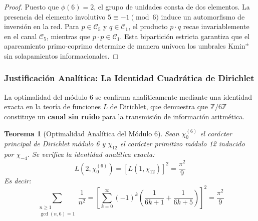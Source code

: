 \documentclass{article}
\numberwithin{equation}{section}
\theoremstyle{plain}
\newtheorem{theorem}{Teorema}[section]
\theoremstyle{definition}
\begin{document}
\begin{proof}
Puesto que $\phi(6) = 2$, el grupo de unidades consta de dos elementos. La presencia del elemento involutivo $5 \equiv -1 \pmod 6$ induce un automorfismo de inversión en la red. Para $p \in \mathcal{C}_5$ y $q \in \mathcal{C}_1$, el producto $p \cdot q$ recae invariablemente en el canal $\mathcal{C}_5$, mientras que $p \cdot p \in \mathcal{C}_1$. Esta bipartición estricta garantiza que el apareamiento primo-coprimo determine de manera unívoca los umbrales $\mathrm{Kmin}^\pm$ sin solapamientos informacionales.
\end{proof}

\subsubsection{Justificación Analítica: La Identidad Cuadrática de Dirichlet}

La optimalidad del módulo 6 se confirma analíticamente mediante una identidad exacta en la teoría de funciones $L$ de Dirichlet, que demuestra que $\mathbb{Z}/6\mathbb{Z}$ constituye un \textbf{canal sin ruido} para la transmisión de información aritmética.

\begin{theorem}[Optimalidad Analítica del Módulo 6]
\label{thm:optimalidad-analitica}
Sean $\chi_0^{(6)}$ el carácter principal de Dirichlet módulo 6 y $\chi_{12}$ el carácter primitivo módulo 12 inducido por $\chi_{-4}$. Se verifica la identidad analítica exacta:
\begin{equation}
L(2, \chi_0^{(6)}) = \left[ L(1, \chi_{12}) \right]^2 = \frac{\pi^2}{9}
\end{equation}
Es decir:
\begin{equation}
\sum_{\substack{n \ge 1 \\ \gcd(n,6)=1}} \frac{1}{n^2} = \left[ \sum_{k=0}^{\infty} (-1)^k \left( \frac{1}{6k+1} + \frac{1}{6k+5} \right) \right]^2 = \frac{\pi^2}{9}
\end{equation}
\end{theorem}
\end{document}

